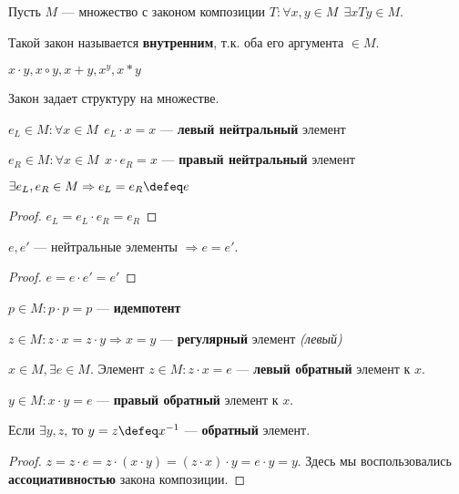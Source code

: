 Пусть \(M\) --- множество с законом композиции \(T : \forall x, y \in M \ \ \exists xTy \in M\).

\begin{remark}
    Такой закон называется \textbf{внутренним}, т.к. оба его аргумента \(\in M\).
\end{remark}

\begin{notation}
    \(x \cdot y, x \circ y, x + y, x^y, x * y\)
\end{notation}

Закон задает структуру на множестве.

\begin{definition}
    \(e_L \in M : \forall x \in M \ \ e_L \cdot x = x\) --- \textbf{левый нейтральный} элемент

    \(e_R \in M : \forall x \in M \ \ x \cdot e_R = x\) --- \textbf{правый нейтральный} элемент
\end{definition}

\begin{lemma}
    \(\exists e_L, e_R \in M \Rightarrow e_L = e_R \defeq e\)
\end{lemma}
\begin{proof}
    \(e_L = e_L \cdot e_R = e_R\)
\end{proof}

\begin{lemma}
    \(e, e'\) --- нейтральные элементы \( \Rightarrow e = e'\).
\end{lemma}
\begin{proof}
    \(e = e \cdot e' = e'\)
\end{proof}

\begin{definition}
    \(p \in M : p \cdot p = p\) --- \textbf{идемпотент}
\end{definition}

\begin{definition}
    \(z \in M : z \cdot x = z \cdot y \Rightarrow x = y\) --- \textbf{регулярный} элемент \textit{(левый)}
\end{definition}

\begin{definition}
    \(x \in M, \exists e \in M\). Элемент \(z \in M : z \cdot x = e\) --- \textbf{левый обратный} элемент к \(x\).

    \(y \in M : x \cdot y = e\) --- \textbf{правый обратный} элемент к \(x\).
\end{definition}

\begin{lemma}
    Если \(\exists y, z\), то \(y = z \defeq x^{-1}\) --- \textbf{обратный} элемент.
\end{lemma}
\begin{proof}
    \(z = z \cdot e = z \cdot (x \cdot y) = (z \cdot x) \cdot y = e \cdot y = y\). Здесь мы воспользовались \textbf{ассоциативностью} закона композиции.
\end{proof}

